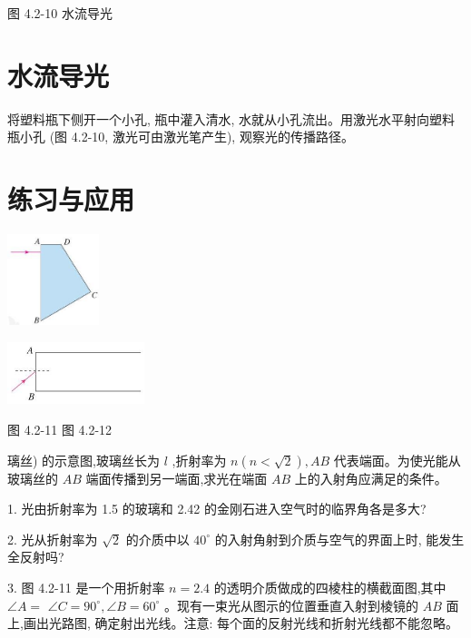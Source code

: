 \documentclass[10pt]{article}
\begin{document}
图 4.2-10 水流导光

\section*{水流导光}

将塑料瓶下侧开一个小孔, 瓶中灌入清水, 水就从小孔流出。用激光水平射向塑料瓶小孔 (图 4.2-10, 激光可由激光笔产生), 观察光的传播路径。

\section*{练习与应用}

\begin{mdframed}

\begin{center}
\includegraphics[max width=0.2\textwidth]{images/01910e4c-ebb8-7d2c-8f2f-2375bc1d2d12_99_715115.jpg}
\end{center}

\begin{center}
\includegraphics[max width=0.3\textwidth]{images/01910e4c-ebb8-7d2c-8f2f-2375bc1d2d12_99_974169.jpg}
\end{center}

图 4.2-11 图 4.2-12

璃丝) 的示意图,玻璃丝长为 \(l\) ,折射率为 \(n\left( {n < \sqrt{2}}\right) ,{AB}\) 代表端面。为使光能从玻璃丝的 \({AB}\) 端面传播到另一端面,求光在端面 \({AB}\) 上的入射角应满足的条件。

\end{mdframed}

1. 光由折射率为 1.5 的玻璃和 2.42 的金刚石进入空气时的临界角各是多大?

2. 光从折射率为 \(\sqrt{2}\) 的介质中以 \({40}^{ \circ }\) 的入射角射到介质与空气的界面上时, 能发生全反射吗?

3. 图 4.2-11 是一个用折射率 \(n = {2.4}\) 的透明介质做成的四棱柱的横截面图,其中 \(\angle A =\) \(\angle C = {90}^{ \circ },\angle B = {60}^{ \circ }\) 。现有一束光从图示的位置垂直入射到棱镜的 \({AB}\) 面上,画出光路图, 确定射出光线。注意: 每个面的反射光线和折射光线都不能忽略。
\end{document}
